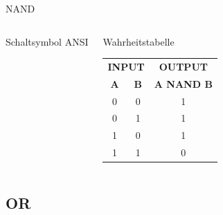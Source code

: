 \begin{frame}{NAND}
\begin{columns}
    {\small Schaltsymbol ANSI}
    \begin{block}{Wahrheitstabelle}
      \begin{tabular}{cc|c}
        \multicolumn{2}{c|}{\textbf{INPUT}} & \textbf{OUTPUT} \\
        \textbf{A} & \textbf{B} & \textbf{A NAND B} \\ \hline
        0 & 0 & 1 \\
        0 & 1 & 1 \\
        1 & 0 & 1 \\
        1 & 1 & 0 \\
      \end{tabular}
    \end{block}
  \end{columns}
\end{frame}

\subsection{OR}

